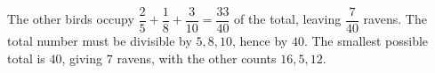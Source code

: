 The other birds occupy $\dfrac{2}{5}+\dfrac{1}{8}+\dfrac{3}{10}=\dfrac{33}{40}$ of the total, leaving $\dfrac{7}{40}$ ravens. The total number must be divisible by $5,8,10$, hence by $40$. The smallest possible total is $40$, giving $\boxed7$ ravens, with the other counts $16,5,12$.
